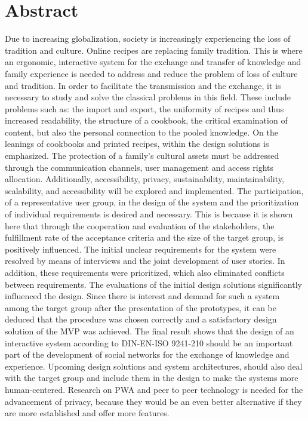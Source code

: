 \chapter*{Abstract}
Due to increasing globalization, society is increasingly experiencing the loss of tradition and culture. Online recipes are replacing family tradition. This is where an ergonomic, interactive system for the exchange and transfer of knowledge and family experience is needed to address and reduce the problem of loss of culture and tradition.
In order to facilitate the transmission and the exchange, it is necessary to study and solve the classical problems in this field. These include problems such as: the import and export, the uniformity of recipes and thus increased readability, the structure of a cookbook, the critical examination of content, but also the personal connection to the pooled knowledge. On the leanings of cookbooks and printed recipes, within the design solutions is emphasized. The protection of a family's cultural assets must be addressed through the communication channels, user management and access rights allocation. Additionally, accessibility, privacy, sustainability, maintainability, scalability, and accessibility will be explored and implemented.
The participation, of a representative user group, in the design of the system and the prioritization of individual requirements is desired and necessary.
This is because it is shown here that through the cooperation and evaluation of the stakeholders, the fulfillment rate of the acceptance criteria and the size of the target group, is positively influenced.
The initial unclear requirements for the system were resolved by means of interviews and the joint development of user stories. In addition, these requirements were prioritized, which also eliminated conflicts between requirements.
The evaluations of the initial design solutions significantly influenced the design. Since there is interest and demand for such a system among the target group after the presentation of the prototypes, it can be deduced that the procedure was chosen correctly and a satisfactory design solution of the MVP was achieved.
The final result shows that the design of an interactive system according to DIN-EN-ISO 9241-210 should be an important part of the development of social networks for the exchange of knowledge and experience. 
Upcoming design solutions and system architectures, should also deal with the target group and include them in the design to make the systems more human-centered. Research on PWA and peer to peer technology is needed for the advancement of privacy, because they would be an even better alternative if they are more established and offer more features.